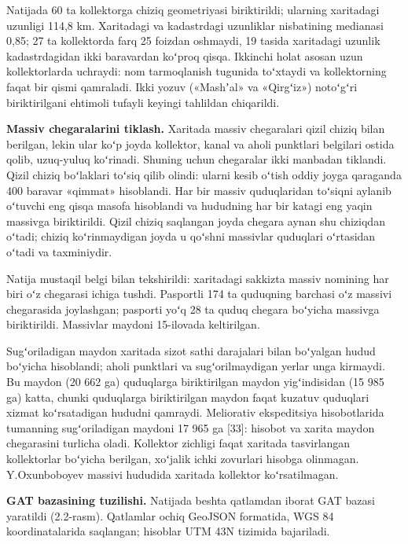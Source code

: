 \documentclass[14pt,a4paper,oneside]{extreport}
\begin{document}
Natijada 60 ta kollektorga chiziq geometriyasi biriktirildi; ularning
xaritadagi uzunligi 114,8 km. Xaritadagi va kadastrdagi uzunliklar
nisbatining medianasi 0,85; 27 ta kollektorda farq 25 foizdan oshmaydi,
19 tasida xaritadagi uzunlik kadastrdagidan ikki baravardan koʻproq
qisqa. Ikkinchi holat asosan uzun kollektorlarda uchraydi: nom
tarmoqlanish tugunida toʻxtaydi va kollektorning faqat bir qismi
qamraladi. Ikki yozuv («Mashʼal» va «Qirgʻiz») notoʻgʻri biriktirilgani
ehtimoli tufayli keyingi tahlildan chiqarildi.

\textbf{Massiv chegaralarini tiklash.} Xaritada massiv chegaralari qizil
chiziq bilan berilgan, lekin ular koʻp joyda kollektor, kanal va aholi
punktlari belgilari ostida qolib, uzuq-yuluq koʻrinadi. Shuning uchun
chegaralar ikki manbadan tiklandi. Qizil chiziq boʻlaklari toʻsiq qilib
olindi: ularni kesib oʻtish oddiy joyga qaraganda 400 baravar «qimmat»
hisoblandi. Har bir massiv quduqlaridan toʻsiqni aylanib oʻtuvchi eng
qisqa masofa hisoblandi va hududning har bir katagi eng yaqin massivga
biriktirildi. Qizil chiziq saqlangan joyda chegara aynan shu chiziqdan
oʻtadi; chiziq koʻrinmaydigan joyda u qoʻshni massivlar quduqlari
oʻrtasidan oʻtadi va taxminiydir.

Natija mustaqil belgi bilan tekshirildi: xaritadagi sakkizta massiv
nomining har biri oʻz chegarasi ichiga tushdi. Pasportli 174 ta
quduqning barchasi oʻz massivi chegarasida joylashgan; pasporti yoʻq 28
ta quduq chegara boʻyicha massivga biriktirildi. Massivlar maydoni
15-ilovada keltirilgan.

Sugʻoriladigan maydon xaritada sizot sathi darajalari bilan boʻyalgan
hudud boʻyicha hisoblandi; aholi punktlari va sugʻorilmaydigan yerlar
unga kirmaydi. Bu maydon (20 662 ga) quduqlarga biriktirilgan maydon
yigʻindisidan (15 985 ga) katta, chunki quduqlarga biriktirilgan maydon
faqat kuzatuv quduqlari xizmat koʻrsatadigan hududni qamraydi.
Meliorativ ekspeditsiya hisobotlarida tumanning sugʻoriladigan maydoni
17 965 ga {[}33{]}: hisobot va xarita maydon chegarasini turlicha oladi.
Kollektor zichligi faqat xaritada tasvirlangan kollektorlar boʻyicha
berilgan, xoʻjalik ichki zovurlari hisobga olinmagan. Y.Oxunboboyev
massivi hududida xaritada kollektor koʻrsatilmagan.

\textbf{GAT bazasining tuzilishi.} Natijada beshta qatlamdan iborat GAT
bazasi yaratildi (2.2-rasm). Qatlamlar ochiq GeoJSON formatida, WGS 84
koordinatalarida saqlangan; hisoblar UTM 43N tizimida bajariladi.
\end{document}
